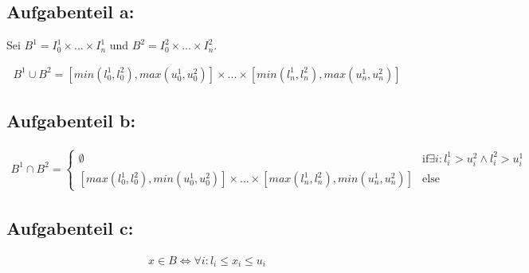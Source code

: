 
\subsection*{Aufgabenteil a:}

Sei $B^1=I_0^1\times ... \times I_n^1$ und $B^2=I_0^2\times ... \times I_n^2$.

\begin{align*}
B^1\cup B^2 = [min(l_0^1,l_0^2), max(u_0^1,u_0^2)] \times ... \times [min(l_n^1,l_n^2), max(u_n^1,u_n^2)]
\end{align*}

\subsection*{Aufgabenteil b:}

\begin{align*}

B^1\cap B^2 = \begin{cases} \emptyset &\text{if} \exists i: l_i^1 > u_i^2 \wedge l_i^2 > u_i^1\\ 
[max(l_0^1,l_0^2), min(u_0^1,u_0^2)] \times ... \times [max(l_n^1,l_n^2), min(u_n^1,u_n^2)]& \text{else}
\end{cases}
\end{align*}

\subsection*{Aufgabenteil c:}
\begin{align*}
x\in B \Leftrightarrow \forall i: l_i\leq x_i \leq u_i
\end{align*}